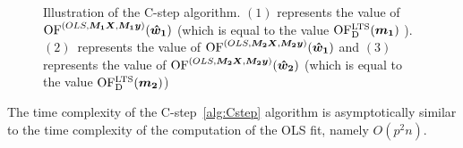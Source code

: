 \begin{figure}[h]
\begin{tikzpicture}
 
\end{tikzpicture}





    \caption{Illustration of the C-step algorithm. $(1)$ represents the value of $\of^{(OLS,\vec{M_1}\vec{X},  \vec{M_1}\vec{y} )} (\vec{\hat{w}_1})$ (which is equal to the value $\oflts(\vec{m_1})$ ). $(2)$~represents  the value of $\of^{(OLS,\vec{M_2}\vec{X},  \vec{M_2}\vec{y} )} (\vec{\hat{w}_1})$ and $(3)$ represents the value of $\of^{(OLS,\vec{M_2}\vec{X},  \vec{M_2}\vec{y} )} (\vec{\hat{w}_2})$ (which is equal to the value $\oflts(\vec{m_2})$) }
    \label{figure:one:c:step}
\end{figure}
    
    






\begin{observation} \label{csteptimecomplexity}
    The time complexity of the C-step~\ref{alg:Cstep} algorithm is asymptotically similar to the time complexity of the computation of the OLS fit, namely $O(p^2n)$.
\end{observation} 

